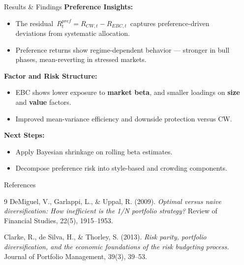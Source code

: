 \documentclass[final]{beamer}
\newlength{\sepwidth}
\newlength{\colwidth}
\newcommand{\separatorcolumn}{\begin{column}{\sepwidth}\end{column}}
\begin{document}
\begin{frame}[t]
\begin{columns}[t]
\begin{column}{\colwidth}
\begin{block}{Results \& Findings}
\textbf{Preference Insights:}
\begin{itemize}
  \item The residual \(\,R^{pref}_t = R_{CW,t} - R_{EBC,t}\,\) captures 
  preference-driven deviations from systematic allocation.
  \item Preference returns show regime-dependent behavior — stronger in bull phases, 
  mean-reverting in stressed markets.
\end{itemize}

\textbf{Factor and Risk Structure:}
\begin{itemize}
  \item EBC shows lower exposure to \textbf{market beta}, 
  and smaller loadings on \textbf{size} and \textbf{value} factors.
  \item Improved mean-variance efficiency and downside protection versus CW.
\end{itemize}

\textbf{Next Steps:}
\begin{itemize}
  \item Apply Bayesian shrinkage on rolling beta estimates.
  \item Decompose preference risk into style-based and crowding components.
\end{itemize}

\end{block}

\begin{block}{References}
\footnotesize
\begin{thebibliography}{9}
DeMiguel, V., Garlappi, L., \& Uppal, R. (2009).  
\textit{Optimal versus naive diversification: How inefficient is the 1/N portfolio strategy?}  
Review of Financial Studies, 22(5), 1915–1953.

Clarke, R., de Silva, H., \& Thorley, S. (2013).  
\textit{Risk parity, portfolio diversification, and the economic foundations of the risk budgeting process.}  
Journal of Portfolio Management, 39(3), 39–53.
\end{thebibliography}
\end{block}

\end{column}
\separatorcolumn
\end{columns}
\end{frame}
\end{document}
